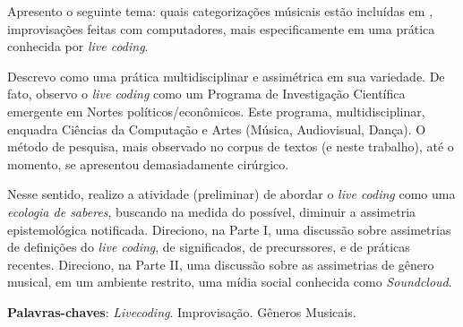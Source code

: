\setlength{\absparsep}{18pt} %
\begin{resumo}
Apresento o seguinte tema: quais categorizações músicais estão incluídas em , improvisações feitas com computadores, mais especificamente em uma prática conhecida por \textit{live coding}.

Descrevo como uma prática multidisciplinar e assimétrica em sua variedade. De fato, observo o \emph{live coding} como um Programa de Investigação Científica emergente em Nortes políticos/econômicos. Este programa, multidisciplinar, enquadra Ciências da Computação e Artes (Música, Audiovisual, Dança). O método de pesquisa, mais observado no corpus de textos (e neste trabalho), até o momento, se apresentou demasiadamente cirúrgico.

Nesse sentido, realizo a atividade (preliminar) de abordar  o \emph{live coding} como uma \emph{ecologia de saberes}, buscando na medida do possível, diminuir a assimetria epistemológica notificada. Direciono, na Parte I, uma discussão sobre assimetrias de definições do \emph{live coding}, de significados, de precurssores, e de práticas recentes. Direciono, na Parte II, uma discussão sobre as assimetrias de gênero musical, em um ambiente restrito, uma mídia social conhecida como \emph{Soundcloud}.

\textbf{Palavras-chaves}: \textit{Livecoding}. Improvisação. Gêneros Musicais.
\end{resumo}

\begin{comment}
\begin{resumo}[Abstract]
 \begin{otherlanguage*}{english}
   This is the english abstract.

   \vspace{\onelineskip}
 
   \noindent 
   \textbf{Key-words}: latex. abntex. text editoration.
 \end{otherlanguage*}
\end{resumo}

\begin{resumo}[Résumé]
 \begin{otherlanguage*}{french}
    Il s'agit d'un résumé en français.
 
   \textbf{Mots-clés}: latex. abntex. publication de textes.
 \end{otherlanguage*}
\end{resumo}

\begin{resumo}[Resumen]
 \begin{otherlanguage*}{spanish}
   Este es el resumen en español.
  
   \textbf{Palabras clave}: latex. abntex. publicación de textos.
 \end{otherlanguage*}
\end{resumo}
\end{comment}
